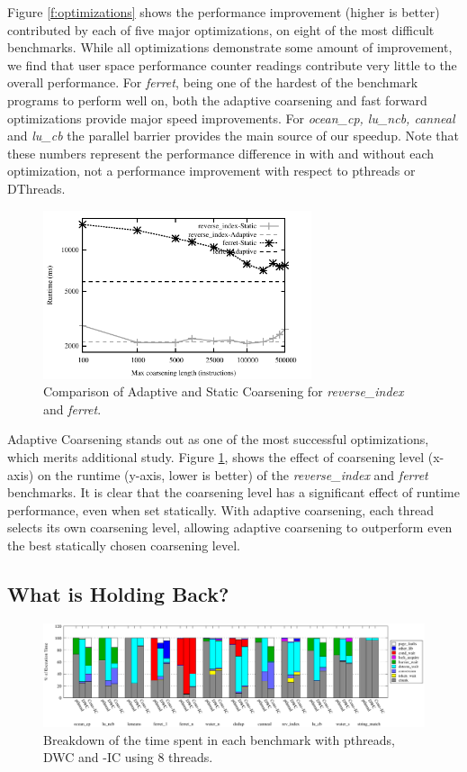 Figure \ref{f:optimizations} shows the performance improvement (higher is better) contributed by each of five major optimizations, on eight of the most difficult benchmarks. While all optimizations demonstrate some amount of improvement, we find that user space performance counter readings contribute very little to the overall performance. For {\it ferret}, being one of the hardest of the benchmark programs to perform well on, both the adaptive coarsening and fast forward optimizations provide major speed improvements. For {\it ocean\_cp, lu\_ncb, canneal} and {\it lu\_cb} the parallel barrier provides the main source of our speedup. Note that these numbers represent the performance difference in \lib{} with and without each optimization, not a performance improvement with respect to pthreads or DThreads. 


\begin{figure}
\centering
\includegraphics[width=3.1in]{figures/adaptive.pdf}
\caption{Comparison of Adaptive and Static Coarsening for {\it reverse\_index} and {\it ferret}. }
\label{f:adaptive}
\end{figure}


Adaptive Coarsening stands out as one of the most successful optimizations, which merits additional study. Figure \ref{f:adaptive}, shows the effect of coarsening level (x-axis) on the runtime (y-axis, lower is better) of the {\it reverse\_index} and {\it ferret} benchmarks. It is clear that the coarsening level has a significant effect of runtime performance, even when set statically. With adaptive coarsening, each thread selects its own coarsening level, allowing adaptive coarsening to outperform even the best statically chosen coarsening level. 

\subsection{What is Holding \Lib{} Back?}
\begin{figure}
\includegraphics[width=7.0in]{figures/fine_grained_analysis.pdf}
\caption{Breakdown of the time spent in each benchmark with pthreads, DWC and \lib{}-IC using 8 threads.}
\label{f:fine-grained}
\end{figure}

